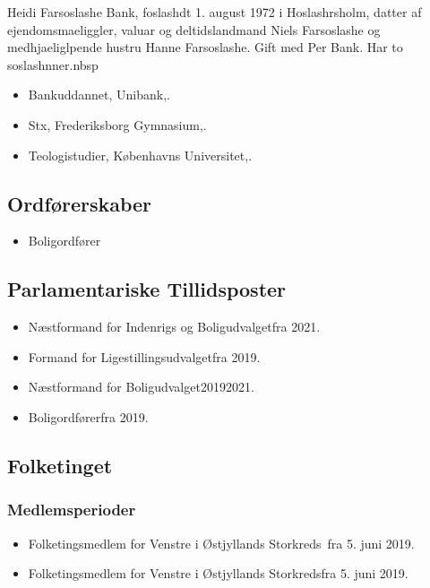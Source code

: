 \documentclass[11pt, a4paper]{awesome-cv}
\begin{document}
\makecvheader[R]
\makelettertitle
\begin{cvletter}
Heidi Farsoslashe Bank, foslashdt 1. august 1972 i Hoslashrsholm, datter af ejendomsmaeliggler, valuar og deltidslandmand Niels Farsoslashe og medhjaeliglpende hustru Hanne Farsoslashe. Gift med Per Bank. Har to soslashnner.nbsp

\begin{itemize}
\item Bankuddannet, Unibank,.
\item Stx, Frederiksborg Gymnasium,.
\item Teologistudier, Københavns Universitet,.
\end{itemize}
\subsection*{Ordførerskaber}
\begin{itemize}
\item Boligordfører
\end{itemize}
\subsection*{Parlamentariske Tillidsposter}
\begin{itemize}
\item Næstformand for Indenrigs og Boligudvalgetfra 2021.
\item Formand for Ligestillingsudvalgetfra 2019.
\item Næstformand for Boligudvalget20192021.
\item Boligordførerfra 2019.
\end{itemize}
\subsection*{Folketinget}
\subsubsection*{Medlemsperioder}
\begin{itemize}
\item Folketingsmedlem for Venstre i Østjyllands Storkreds fra 5. juni 2019.
\item Folketingsmedlem for Venstre i Østjyllands Storkredsfra 5. juni 2019.
\end{itemize}

\end{cvletter}
\end{document}
